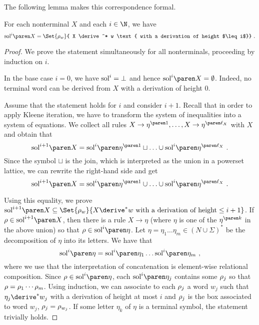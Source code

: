 \documentclass[../../diss.tex]{subfiles}
\begin{document}
The following lemma makes this correspondence formal.
\begin{lemma}%
\label{Lemma:EDSRegInclSoundnessHelper}%
    For each nonterminal $X$ and each $i \in \N$, we have
    \[
        \sol{i}{X}
        = \Set{ \tbox{w} }{ X \derive^* w \text{ with a derivation of height $\leq i$}}
        \ .
    \]
\end{lemma}

\begin{proof}
    We prove the statement simultaneously for all nonterminals, proceeding by induction on $i$.

    In the base case $i = 0$, we have $\text{sol}^{i} = \bot$ and hence $\sol{i}{X} = \emptyset$.
    Indeed, no terminal word can be derived from $X$ with a derivation of height $0$.

    Assume that the statement holds for $i$ and consider $i+1$.
    Recall that in order to apply Kleene iteration, we have to transform the system of inequalities into a system of equations.
    We collect all rules $X \to\itr{\eta}{1}, \ldots, X \to \itr{\eta}{\ell_X}$ with $X$ and obtain that
    \[
        \sol{i+1}{X} = \sol{i}{\itr{\eta}{1}} \sqcup \ldots \cup \sol{i}{\itr{\eta}{\ell_X}}
        \ .
    \]
    Since the symbol $\sqcup$ is the join, which is interpreted as the union in a powerset lattice, we can rewrite the right-hand side and get
    \[
        \sol{i+1}{X} = \sol{i}{\itr{\eta}{1}} \cup \ldots \cup \sol{i}{\itr{\eta}{\ell_X}}
        \ .
    \]

    Using this equality, we prove $\sol{i+1}{X} \subseteq \Set{ \tbox{w} }{ X \derive^* w \text{ with a derivation of height} \leq i+1}$.
    If $\tbox \in \sol{i+1}{X}$, then there is a rule $X \to \eta$ (where $\eta$ is one of the $\itr{\eta}{k}$ in the above union) so that $\tbox \in \sol{i}{\eta}$.
    Let $\eta = \eta_1 \ldots \eta_m \in {(N \cup \Sigma)}^*$ be the decomposition of $\eta$ into its letters.
    We have that
    \[
        \sol{i}{\eta} = \sol{i}{\eta_1}\ldots\sol{i}{\eta_m}
        \ ,
    \]
    where we use that the interpretation of concatenation is element-wise relational composition.
    Since $\tbox \in \sol{i}{\eta}$, each $\sol{i}{\eta_j}$ contains some $\tbox_j$ so that $\tbox = \tbox_1 \cdots \tbox_m$.
    Using induction, we can associate to each $\tbox_j$ a word $w_j$ such that $\eta_j \derive^* w_j$ with a derivation of height at most $i$ and $\tbox_j$ is the box associated to word $w_j$, $\tbox_j = \tbox{w_j}$.
    If some letter $\eta_k$ of $\eta$ is a terminal symbol, the statement trivially holds.


\end{proof}
\end{document}
